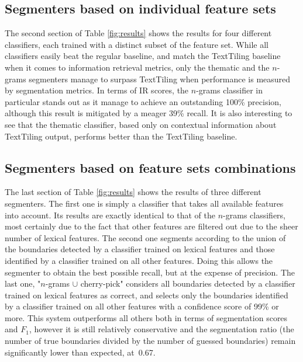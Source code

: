 \subsection{Segmenters based on individual feature sets}

The second section of Table \ref{fig:results} shows the results for four different classifiers, each trained with a distinct subset of the feature set. While all classifiers easily beat the regular baseline, and match the TextTiling baseline when it comes to information retrieval metrics, only the thematic and the $n$-grams segmenters manage to surpass TextTiling when performance is measured by segmentation metrics. In terms of IR scores, the $n$-grams classifier in particular stands out as it manage to achieve an outstanding 100\% precision, although this result is mitigated by a meager 39\% recall. It is also interesting to see that the thematic classifier, based only on contextual information about TextTiling output, performs better than the TextTiling baseline.

\subsection{Segmenters based on feature sets combinations}

The last section of Table \ref{fig:results} shows the results of three different segmenters. The first one is simply a classifier that takes all available features into account. Its results are exactly identical to that of the $n$-grams classifiers, most certainly due to the fact that other features are filtered out due to the sheer number of lexical features. The second one segments according to the union of the boundaries detected by a classifier trained on lexical features and those identified by a classifier trained on all other features. Doing this allows the segmenter to obtain the best possible recall, but at the expense of precision. The last one, "$n$-grams $\cup$ cherry-pick"  considers all boundaries detected by a classifier trained on lexical features as correct, and selects only the boundaries identified by a classifier trained on all other features with a confidence score of 99\% or more. This system outperforms all others both in terms of segmentation scores and $F_1$, however it is still relatively conservative and the segmentation ratio (the number of true boundaries divided by the number of guessed boundaries) remain significantly lower than expected, at~0.67.
